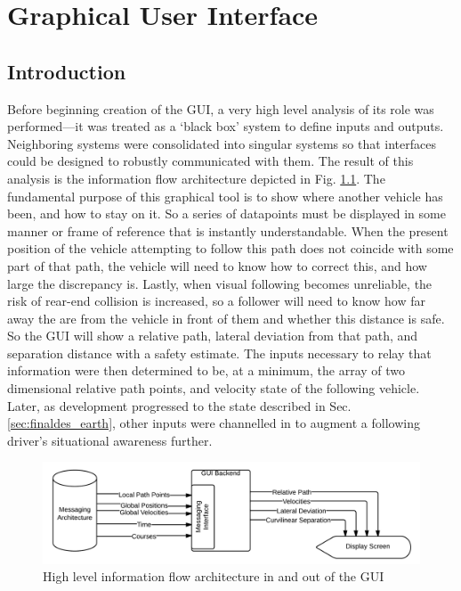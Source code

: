 \documentclass[12pt]{report}
\begin{document}
\chapter{Graphical User Interface} \label{chap:gui}

\section{Introduction} \label{sec:guiintro}

Before beginning creation of the GUI, a very high level analysis of its role was performed---it was treated as a `black box' system to define inputs and outputs. Neighboring systems were consolidated into singular systems so that interfaces could be designed to robustly communicated with them. The result of this analysis is the information flow architecture depicted in Fig. \ref{fig:blackboxflow}.
The fundamental purpose of this graphical tool is to show where another vehicle has been, and how to stay on it. So a series of datapoints must be displayed in some manner or frame of reference that is instantly understandable. When the present position of the vehicle attempting to follow this path does not coincide with some part of that path, the vehicle will need to know how to correct this, and how large the discrepancy is. Lastly, when visual following becomes unreliable, the risk of rear-end collision is increased, so a follower will need to know how far away the are from the vehicle in front of them and whether this distance is safe. So the GUI will show a relative path, lateral deviation from that path, and separation distance with a safety estimate.
The inputs necessary to relay that information were then determined to be, at a minimum, the array of two dimensional relative path points, and velocity state of the following vehicle. Later, as development progressed to the state described in Sec. \ref{sec:finaldes_earth}, other inputs were channelled in to augment a following driver's situational awareness further.

\begin{figure}[ht] \label{fig:blackboxflow} \centering
    \includegraphics[width=6.5in]{./figs/blackbox_flowchart.png}
    \caption{High level information flow architecture in and out of the GUI}
\end{figure}
\end{document}
